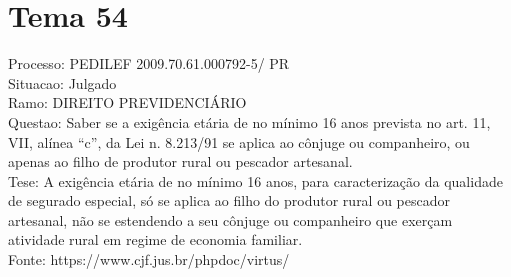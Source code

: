 \documentclass[12pt]{article}
\begin{document}
\section*{Tema 54}
Processo: PEDILEF 2009.70.61.000792-5/ PR\\
Situacao: Julgado\\
Ramo: DIREITO PREVIDENCIÁRIO\\
Questao: Saber se a exigência etária de no mínimo 16 anos prevista no art. 11, VII, alínea “c”, da Lei n. 8.213/91 se aplica ao cônjuge ou companheiro, ou apenas ao filho de produtor rural ou pescador artesanal.\\
Tese: A exigência etária de no mínimo 16 anos, para caracterização da qualidade de segurado especial, só se aplica ao filho do produtor rural ou pescador artesanal, não se estendendo a seu cônjuge ou companheiro que exerçam atividade rural em regime de economia familiar.\\
Fonte: https://www.cjf.jus.br/phpdoc/virtus/
\end{document}
